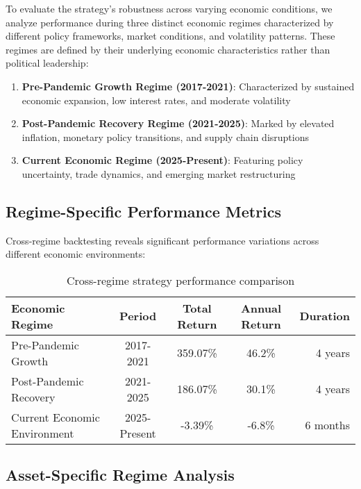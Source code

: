 \documentclass[onecolumn,11pt]{IEEEtran}
\begin{document}
To evaluate the strategy's robustness across varying economic conditions, we analyze performance during three distinct economic regimes characterized by different policy frameworks, market conditions, and volatility patterns. These regimes are defined by their underlying economic characteristics rather than political leadership:

\begin{enumerate}
    \item \textbf{Pre-Pandemic Growth Regime (2017-2021)}: Characterized by sustained economic expansion, low interest rates, and moderate volatility
    \item \textbf{Post-Pandemic Recovery Regime (2021-2025)}: Marked by elevated inflation, monetary policy transitions, and supply chain disruptions
    \item \textbf{Current Economic Regime (2025-Present)}: Featuring policy uncertainty, trade dynamics, and emerging market restructuring
\end{enumerate}

\subsection{Regime-Specific Performance Metrics}

Cross-regime backtesting reveals significant performance variations across different economic environments:

\begin{table}[h]
\centering
\begin{tabular}{lcccr}
\toprule
\textbf{Economic Regime} & \textbf{Period} & \textbf{Total Return} & \textbf{Annual Return} & \textbf{Duration} \\
\midrule
Pre-Pandemic Growth & 2017-2021 & 359.07\% & 46.2\% & 4 years \\
Post-Pandemic Recovery & 2021-2025 & 186.07\% & 30.1\% & 4 years \\
Current Economic Environment & 2025-Present & -3.39\% & -6.8\% & 6 months \\
\bottomrule
\end{tabular}
\caption{Cross-regime strategy performance comparison}
\label{tab:regime_performance}
\end{table}

\subsection{Asset-Specific Regime Analysis}
\end{document}

